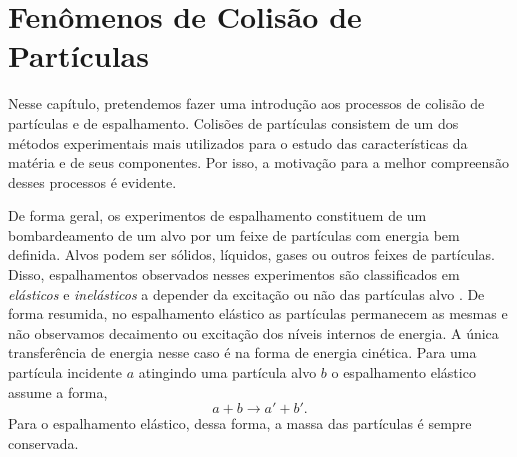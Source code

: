 \chapter{Fenômenos de Colisão de Partículas}
Nesse capítulo, pretendemos fazer uma introdução aos processos de colisão de
partículas e de espalhamento. Colisões de partículas consistem de um dos
métodos experimentais mais utilizados para o estudo das características da
matéria e de seus componentes. Por isso, a motivação para a melhor compreensão
desses processos é evidente.

De forma geral, os experimentos de espalhamento constituem de um bombardeamento
de um alvo por um feixe de partículas com energia bem definida. Alvos podem ser
sólidos, líquidos, gases ou outros feixes de partículas. Disso, espalhamentos
observados nesses experimentos são classificados em \textit{elásticos} e
\textit{inelásticos} a depender da excitação ou não das partículas alvo
\cite{povh6ed}. De forma resumida, no espalhamento elástico as partículas
permanecem as mesmas e não observamos decaimento ou excitação dos níveis
internos de energia. A única transferência de energia nesse caso é na forma de
energia cinética. Para uma partícula incidente $a$ atingindo uma partícula alvo
$b$ o espalhamento elástico assume a forma,
\begin{equation}
	a + b \rightarrow a' + b' .
\end{equation}
Para o espalhamento elástico, dessa forma, a massa das partículas é sempre
conservada.



